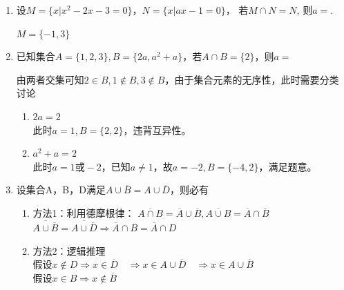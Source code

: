 \begin{enumerate}
    \item 设$M=\{x|x^2-2x-3=0\}$，$N = \{x|ax-1=0\}$， 若$M \cap N = N$, 则$a=$. 
    \begin{jieda}
        $M = \{-1, 3\}$
    \end{jieda}
    \item 已知集合$A = \{1,2,3\}, B = \{2a, a^2+a\}$，若$A \cap B = \{2\}$，则$a =$
    \begin{jieda}
        由两者交集可知$2 \in B, 1 \notin B, 3 \notin B$，由于集合元素的无序性，此时需要分类讨论
        \begin{enumerate}
            \item $2a = 2$ \\
            此时$a = 1, B = \{2, 2\}$，违背互异性。
            \item $a^2+a = 2$ \\
            此时$a = 1 \mbox{或} -2$，已知$a \neq 1$，故$a = -2, B = \{-4, 2\}$，满足题意。
        \end{enumerate}
    \end{jieda}
    \item 设集合A，B，D满足$A \cup \overline{B} = A \cup \overline{D}$，则必有
    \begin{jieda}
        \begin{enumerate}
            \item 方法1：利用德摩根律： $\overline{A \cap B}= \overline{A} \cup \overline{B}, \overline{A \cup B}= \overline{A} \cap \overline{B}$ \\
            $\overline{A \cup \overline{B}} = \overline{A \cup \overline{D}} \Longrightarrow \overline{A} \cap B = \overline{A} \cap D$
            \item 方法2：逻辑推理 \\
            假设$x \notin D \Longrightarrow x \in \overline{D} \quad \Longrightarrow x \in A \cup \overline{D} \quad \Longrightarrow x \in A \cup \overline{B}$ \\
            假设$x \in B \Longrightarrow x \notin \overline{B}$\\

\end{enumerate}
\end{jieda}
\end{enumerate}
